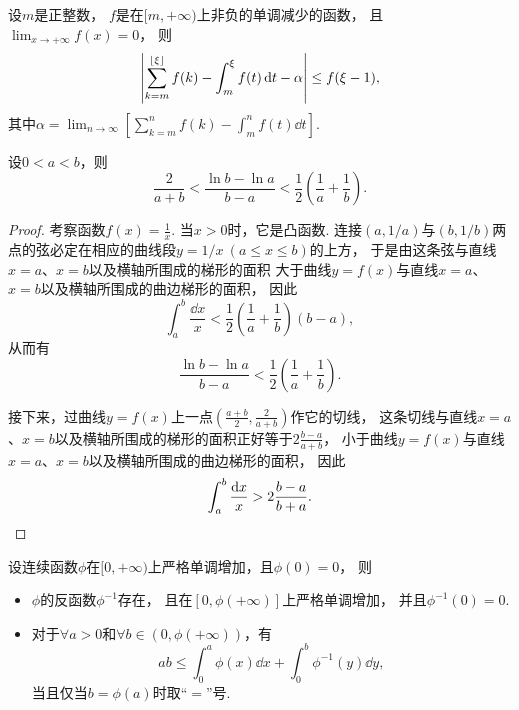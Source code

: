 \begin{corollary}
设\(m\)是正整数，
\(f\)是在\([m,+\infty)\)上非负的单调减少的函数，
且\(\lim_{x\to+\infty} f(x) = 0\)，
则\begin{equation*}
	\abs{
		\sum_{k=m}^{\lfloor\xi\rfloor} f(k)
		- \int_m^\xi f(t) \dd{t}
		- \alpha
	}
	\leq
	f(\xi-1),
\end{equation*}
其中\(\alpha = \lim_{n\to\infty} \left[
	\sum_{k=m}^n f(k)
	- \int_m^n f(t) \dd{t}
\right]\).
\end{corollary}

\begin{proposition}
设\(0<a<b\)，则\begin{equation}
	\frac2{a+b}
	< \frac{\ln b - \ln a}{b - a}
	< \frac12 \left(\frac1a + \frac1b\right).
\end{equation}
\begin{proof}
考察函数\(f(x) = \frac1x\).
当\(x>0\)时，它是凸函数.
连接\((a,1/a)\)与\((b,1/b)\)两点的弦必定在相应的曲线段\(y=1/x\ (a \leq x \leq b)\)的上方，
于是由这条弦与直线\(x=a\)、\(x=b\)以及横轴所围成的梯形的面积
大于曲线\(y = f(x)\)与直线\(x=a\)、\(x=b\)以及横轴所围成的曲边梯形的面积，
因此\begin{equation*}
	\int_a^b \frac{\dd{x}}{x}
	< \frac12 \left( \frac1a + \frac1b \right) (b-a),
\end{equation*}
从而有\begin{equation*}
	\frac{\ln b - \ln a}{b - a}
	< \frac12 \left( \frac1a + \frac1b \right).
\end{equation*}

接下来，过曲线\(y = f(x)\)上一点\(\left( \frac{a+b}{2}, \frac{2}{a+b} \right)\)作它的切线，
这条切线与直线\(x=a\)、\(x=b\)以及横轴所围成的梯形的面积正好等于\(2\frac{b-a}{a+b}\)，
小于曲线\(y = f(x)\)与直线\(x=a\)、\(x=b\)以及横轴所围成的曲边梯形的面积，
因此\begin{equation*}
	\int_a^b \frac{\dd{x}}{x}
	> 2\frac{b-a}{b+a}.
	\qedhere
\end{equation*}
\end{proof}
\end{proposition}

\begin{proposition}
设连续函数\(\phi\)在\([0,+\infty)\)上严格单调增加，且\(\phi(0) = 0\)，
则\begin{itemize}
	\item \(\phi\)的反函数\(\phi^{-1}\)存在，
	且在\([0,\phi(+\infty)]\)上严格单调增加，
	并且\(\phi^{-1}(0) = 0\).

	\item 对于\(\forall a>0\)和\(\forall b\in(0,\phi(+\infty))\)，有\begin{equation}
		a b \leq \int_0^a \phi(x) \dd{x} + \int_0^b \phi^{-1}(y) \dd{y},
	\end{equation}
	当且仅当\(b = \phi(a)\)时取“\(=\)”号.
\end{itemize}
\end{proposition}
